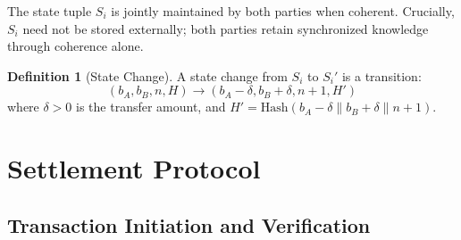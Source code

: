 \documentclass[twocolumn,10pt,a4paper]{article}
\theoremstyle{plain}
\theoremstyle{definition}
\newtheorem{definition}[theorem]{Definition}
\begin{document}
The state tuple $S_i$ is jointly maintained by both parties when coherent. Crucially, $S_i$ need not be stored externally; both parties retain synchronized knowledge through coherence alone.

\begin{definition}[State Change]
A state change from $S_i$ to $S_i'$ is a transition:
\[
(b_A, b_B, n, H) \to (b_A - \delta, b_B + \delta, n+1, H')
\]
where $\delta > 0$ is the transfer amount, and $H' = \mathrm{Hash}(b_A - \delta \| b_B + \delta \| n+1)$.
\end{definition}

\section{Settlement Protocol}
\label{sec:protocol}

\subsection{Transaction Initiation and Verification}
\end{document}
